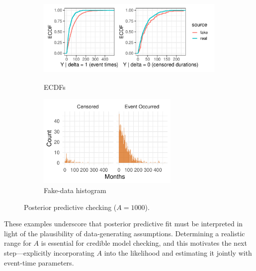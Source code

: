 \begin{figure}[H]
\centering
\begin{subfigure}[t]{0.64\textwidth}
  \centering
  \includegraphics[height=4.5cm,width=\textwidth]{images/ppc_two_a1000.pdf}  %
  \caption{{\small ECDFs}}
  \label{fig:ecdf-event_a1000}
\end{subfigure}
\begin{subfigure}[t]{0.351\textwidth}
  \centering
  \includegraphics[height=4.5cm,width=\linewidth]{images/fake_duration_hist_a1000.pdf}   %
  \caption{{\small Fake-data histogram}}
  \label{fig:fake-hist_a1000}
\end{subfigure}
\caption{{\small Posterior predictive checking ($A=1000$).}}
\label{fig:ppc-A1000}
\end{figure}
These examples underscore that posterior predictive fit must be interpreted in light of the plausibility of data-generating assumptions. Determining a realistic range for $A$ is essential for credible model checking, and this motivates the next step—explicitly incorporating $A$ into the likelihood and estimating it jointly with event-time parameters.